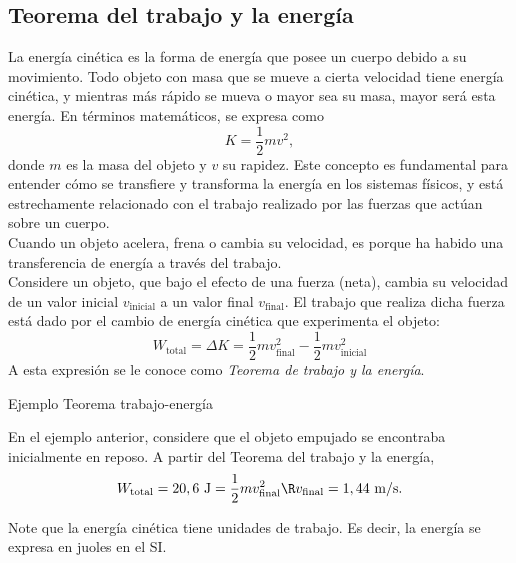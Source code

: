 \subsection{Teorema del trabajo y la energ\'ia}
La energía cinética es la forma de energía que posee un cuerpo debido a su movimiento. Todo objeto con masa que se mueve a cierta velocidad tiene energía cinética, y mientras más rápido se mueva o mayor sea su masa, mayor será esta energía. En términos matemáticos, se expresa como 
\begin{equation}
K=\frac{1}{2}mv^{2},
\end{equation}
donde $m$ es la masa del objeto y $v$ su rapidez. Este concepto es fundamental para entender cómo se transfiere y transforma la energía en los sistemas físicos, y está estrechamente relacionado con el trabajo realizado por las fuerzas que actúan sobre un cuerpo.\\[.35cm]


Cuando un objeto acelera, frena o cambia su velocidad, es porque ha habido una transferencia de energía a través del trabajo. \\[.35cm]

Considere un objeto, que bajo el efecto de una fuerza (neta), cambia su velocidad de un valor inicial $v_{\text{inicial}}$ a un valor final $v_{\text{final}}$. El trabajo que realiza dicha fuerza est\'a dado por el cambio de energ\'ia cin\'etica que experimenta el objeto:
\begin{equation}
W_{\text{total}}=\Delta K=\frac{1}{2}mv_{\text{final}}^{2}-\frac{1}{2}mv_{\text{inicial}}^{2}
\end{equation}
A esta expresi\'on se le conoce como \textit{Teorema de trabajo y la energ\'ia}.\\[.35cm]

\begin{wwteorema}{Ejemplo Teorema trabajo-energ\'ia}

En el ejemplo anterior, considere que el objeto empujado se encontraba inicialmente  en reposo.  
 A partir del Teorema del trabajo y la energ\'ia, 
$$W_{\text{total}}=20,6\text{ J}=\frac{1}{2}mv_{\text{final}}^2\R v_{\text{final}}=1,44\text{ m/s.}$$
\end{wwteorema}
Note que la energ\'ia cin\'etica tiene unidades de trabajo. Es decir, la energ\'ia se expresa en juoles  en el SI.\\[.35cm]

